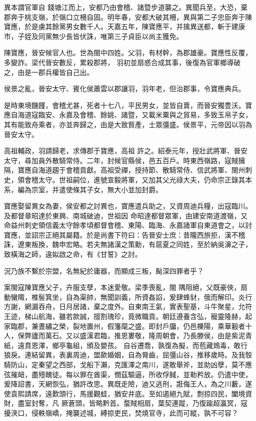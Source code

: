 \begin{pinyinscope}
 異本謂官軍自
 錢塘江而上，安都乃由會稽、諸暨步道襲之。異聞兵至，大恐，棄郡奔于桃支嶺，於嶺口立柵自固。明年春，安都大破其柵，異與第二子忠臣奔于陳寶應，於是虜其餘黨男女數千人。天嘉五年，陳寶應平，并擒異送都，斬于建康市，子姪及同黨無少長皆伏誅，唯第三子貞臣以尚主獲免。



 陳寶應，晉安候官人也。世為閩中四姓。父羽，有材幹，為郡雄豪。寶應性反覆，多變詐。梁代晉安數反，累殺郡將，
 羽初並扇惑合成其事，後復為官軍鄉導破之，由是一郡兵權皆自己出。



 侯景之亂，晉安太守、賓化侯蕭雲以郡讓羽，羽年老，但治郡事，令寶應典兵。



 是時東境饑饉，會稽尤甚，死者十七八，平民男女，並皆自賣，而晉安獨豊沃。寶應自海道寇臨安、永嘉及會稽、餘姚、諸暨，又載米粟與之貿易，多致玉帛子女，其有能致舟乘者，亦並奔歸之，由是大致貲產，士眾彊盛。侯景平，元帝因以羽為晉安太守。



 高祖輔政，羽請歸老，求傳郡于寶應，高祖
 許之。紹泰元年，授壯武將軍、晉安太守，尋加員外散騎常侍。二年，封候官縣侯，邑五百戶。時東西嶺路，寇賊擁隔，寶應自海道趨于會稽貢獻。高祖受禪，授持節、散騎常侍、信武將軍、閩州刺史，領會稽太守。世祖嗣位，進號宣毅將軍，又加其父光祿大夫，仍命宗正錄其本系，編為宗室，并遣使條其子女，無大小並加封爵。



 寶應娶留異女為妻，侯安都之討異也，寶應遣兵助之，又資周迪兵糧，出寇臨川。及都督章昭達於東興、南城破迪，世祖因
 命昭達都督眾軍，由建安南道渡嶺，又命益州刺史領信義太守餘孝頃都督會稽、東陽、臨海、永嘉諸軍自東道會之，以討寶應，並詔宗正絕其屬籍。於是尚書下符曰：告晉安士庶：昔隴西旅拒，漢不稽誅，遼東叛換，魏申宏略。若夫無諸漢之策勳，有扈夏之同姓，至於納吳濞之子，致橫海之師，違姒啟之命，有《甘誓》之討。



 況乃族不繫於宗盟，名無紀於庸器，而顯成三叛，颭深四罪者乎？



 案閩寇陳寶應父子，卉服支孽，本迷愛敬。梁季喪亂，閩
 隅阻絕，父既豪俠，扇動蠻陬，椎髻箕坐，自為渠帥，無聞訓義，所資姦諂，爰肆蜂豺，俄而解印。炎行方謝，網漏吞舟，日月居諸，棄之度外。自東南王氣，實表聖基，斗牛聚星，允符王迹，梯山航海，雖若款誠，擅割瑰珍，竟微職貢。朝廷遵養含弘，寵靈隆赫，起家臨郡，兼晝繡之榮，裂地置州，假籓麾之盛。即封戶牖，仍邑櫟陽，乘華轂者十人，保弊廬而萬石。又以盛漢君臨，推恩婁敬，隆周朝會，乃長滕侯，由是紫泥青紙，遠賁恩澤，鄉亭龜組，頒及嬰孩。
 自谷遷喬，孰復為擬，而苞藏鴆毒，敢行狼戾。連結留異，表裏周迪，盟歃婚姻，自為脣齒，屈彊山谷，推移歲時。及我彀騎防山，定秦望之西部，戈船下瀨，克匯澤之南川，遂敢舉斧，並助凶孽，莫不應弦摧衄，盡殪醜徒。每以罪在酋渠，憫茲驅逼，所收俘馘，並勒矜放。仍遣中使，爰降詔書，天網恢弘，猶許改思。異既走險，迪又逃刑，誑侮王人，為之川藪，遂使袁熙請席，遠歎頭行，馬援觀蛙，猶安井底。至如遏絕九賦，剽掠四民，闔境資財，盡室封奪，凡
 厥蒼頭，皆略黔首。蝥賊相扇，葉契連蹤，乃復踰超瀛冥，寇擾浹口，侵軼嶺嶠，掩襲述城，縛掠吏民，焚燒官寺，此而可縱，孰不可容？




\end{pinyinscope}
